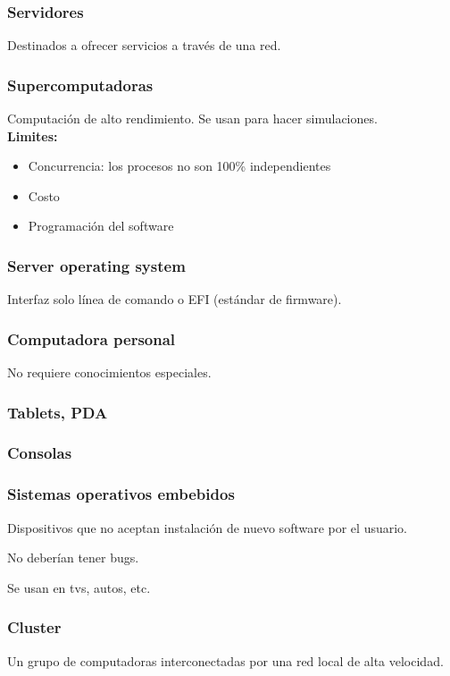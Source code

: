 \documentclass[a4paper, twoside]{article}
\begin{document}
\subsubsection{Servidores}
Destinados a ofrecer servicios a través de una red.

\subsubsection{Supercomputadoras}
Computación de alto rendimiento. Se usan para hacer simulaciones.\\

\textbf{Limites:}
\begin{itemize}
	\item Concurrencia: los procesos no son 100\% independientes
	\item Costo
	\item Programación del software
\end{itemize}

\subsubsection{Server operating system}
Interfaz solo línea de comando o EFI (estándar de firmware).

\subsubsection{Computadora personal}
No requiere conocimientos especiales.

\subsubsection{Tablets, PDA}

\subsubsection{Consolas}

\subsubsection{Sistemas operativos embebidos}
Dispositivos que no aceptan instalación de nuevo software por el usuario.

No deberían tener bugs.

Se usan en tvs, autos, etc.

\subsubsection{Cluster}
Un grupo de computadoras interconectadas por una red local de alta velocidad.
\end{document}
